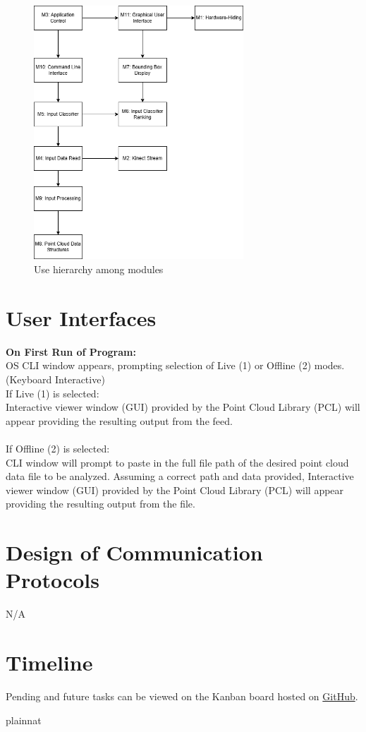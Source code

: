 \documentclass[12pt, titlepage]{article}
\begin{document}
\begin{figure}[H]
\centering
\includegraphics[width=0.7\textwidth]{ModuleHierarchy.png}
\caption{Use hierarchy among modules}
\label{FigUH}
\end{figure}


\section{User Interfaces}

\noindent \textbf{On First Run of Program:}\\
OS CLI window appears, prompting selection of Live (1) or Offline (2) modes. (Keyboard Interactive)\\

\noindent If Live (1) is selected:\\
Interactive viewer window (GUI) provided by the Point Cloud Library (PCL) will appear providing the resulting output from the feed.\\
\\

\noindent If Offline (2) is selected:\\
CLI window will prompt to paste in the full file path of the desired point cloud data file to be analyzed. 
Assuming a correct path and data provided, Interactive viewer window (GUI) provided by the Point Cloud Library (PCL) will appear providing the resulting output from the file.\\

\section{Design of Communication Protocols}

N/A

\section{Timeline}

Pending and future tasks can be viewed on the Kanban board hosted on \href{https://github.com/users/takhtart/projects/3}{GitHub}.

 {plainnat}


\newpage{}
\end{document}
